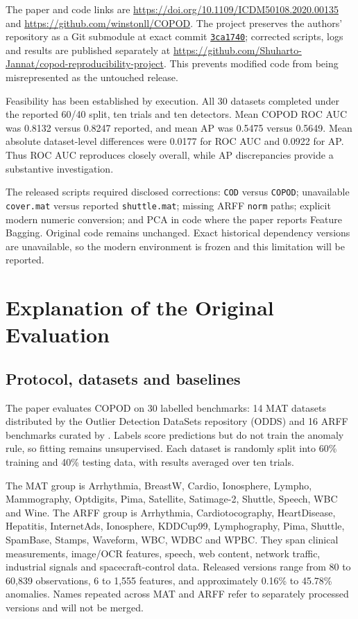 \documentclass[11pt,a4paper,twocolumn]{article}
\newcommand{\repo}{\url{https://github.com/Shuharto-Jannat/copod-reproducibility-project}}
\begin{document}
The paper and code links are \url{https://doi.org/10.1109/ICDM50108.2020.00135} and \url{https://github.com/winstonll/COPOD}. The project preserves the authors' repository as a Git submodule at exact commit \href{https://github.com/winstonll/COPOD/commit/3ca17400016386546d2c199886e81bdcc859b36b}{\texttt{3ca1740}}; corrected scripts, logs and results are published separately at \repo. This prevents modified code from being misrepresented as the untouched release.

Feasibility has been established by execution. All 30 datasets completed under the reported 60/40 split, ten trials and ten detectors. Mean COPOD ROC AUC was 0.8132 versus 0.8247 reported, and mean AP was 0.5475 versus 0.5649. Mean absolute dataset-level differences were 0.0177 for ROC AUC and 0.0922 for AP. Thus ROC AUC reproduces closely overall, while AP discrepancies provide a substantive investigation.

The released scripts required disclosed corrections: \texttt{COD} versus \texttt{COPOD}; unavailable \texttt{cover.mat} versus reported \texttt{shuttle.mat}; missing ARFF \texttt{norm} paths; explicit modern numeric conversion; and PCA in code where the paper reports Feature Bagging. Original code remains unchanged. Exact historical dependency versions are unavailable, so the modern environment is frozen and this limitation will be reported.

\section{Explanation of the Original Evaluation}
\subsection{Protocol, datasets and baselines}

The paper evaluates COPOD on 30 labelled benchmarks: 14 MAT datasets distributed by the Outlier Detection DataSets repository (ODDS) and 16 ARFF benchmarks curated by \citet{campos2016}. Labels score predictions but do not train the anomaly rule, so fitting remains unsupervised. Each dataset is randomly split into 60\% training and 40\% testing data, with results averaged over ten trials.

The MAT group is Arrhythmia, BreastW, Cardio, Ionosphere, Lympho, Mammography, Optdigits, Pima, Satellite, Satimage-2, Shuttle, Speech, WBC and Wine. The ARFF group is Arrhythmia, Cardiotocography, HeartDisease, Hepatitis, InternetAds, Ionosphere, KDDCup99, Lymphography, Pima, Shuttle, SpamBase, Stamps, Waveform, WBC, WDBC and WPBC. They span clinical measurements, image/OCR features, speech, web content, network traffic, industrial signals and spacecraft-control data. Released versions range from 80 to 60,839 observations, 6 to 1,555 features, and approximately 0.16\% to 45.78\% anomalies. Names repeated across MAT and ARFF refer to separately processed versions and will not be merged.
\end{document}
